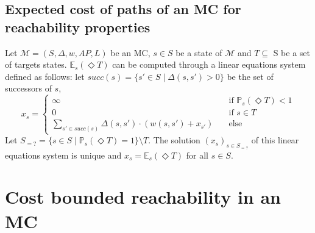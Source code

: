 \subsection{Expected cost of paths of an MC for reachability properties}\label{app-expMC}
  Let $\mathcal{M} = (S, \Delta, w, AP, L)$ be an MC, $s \in S$ be a state of $\mathcal{M}$ and $T \subseteq$ S be a set of targets states. $\mathbb{E}_s(\Diamond T)$ can be computed through a linear equations system defined as follows:
  let $succ(s) = \{ s' \in S \; | \; \Delta(s, s') > 0 \}$ be the set of successors of $s$,
  \[ x_s =
  	\begin{cases}
  	\infty & \quad \text{if } \mathbb{P}_s(\Diamond T) < 1 \\
  	0 & \quad \text{if } s \in T \\
  	\sum_{s' \in succ(s)} \Delta(s, s') \cdot (w(s, s') + x_{s'}) & \quad \text{else}
  	\end{cases}
  \]
Let $S_{=?} = \{ s \in S \; | \; \mathbb{P}_s(\Diamond T) = 1 \} \setminus T$. The solution $(x_s)_{s \in S_{=?}}$ of this linear equations system is unique and $x_s = \mathbb{E}_s(\Diamond T)$ for all $s \in S$.

\section{Cost bounded reachability in an MC}\label{app-cbrMC}

